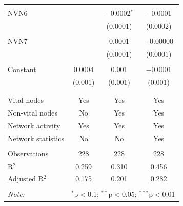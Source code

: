 \begin{table}[!htbp]
\begin{tabular}{@{\extracolsep{5pt}}lccc}
  & & & \\ 
 NVN6 &  & $-$0.0002$^{*}$ & $-$0.0001 \\ 
  &  & (0.0001) & (0.0002) \\ 
  & & & \\ 
 NVN7 &  & 0.0001 & $-$0.00000 \\ 
  &  & (0.0001) & (0.0001) \\ 
  & & & \\ 
 Constant & 0.0004 & 0.001 & $-$0.0001 \\ 
  & (0.001) & (0.001) & (0.001) \\ 
  & & & \\ 
\hline \\[-1.8ex] 
Vital nodes & Yes & Yes & Yes \\ 
Non-vital nodes & No & Yes & Yes \\ 
Network activity & Yes & Yes & Yes \\ 
Network statistics & No & No & Yes \\ 
\hline &  &  &  \\ 
Observations & 228 & 228 & 228 \\ 
R$^{2}$ & 0.259 & 0.310 & 0.456 \\ 
Adjusted R$^{2}$ & 0.175 & 0.201 & 0.282 \\ 
\hline 
\hline \\[-1.8ex] 
\textit{Note:}  & \multicolumn{3}{r}{$^{*}$p$<$0.1; $^{**}$p$<$0.05; $^{***}$p$<$0.01} \\ 
\end{tabular} 
\end{table} 
